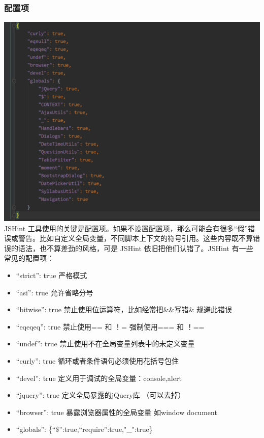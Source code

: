 \documentclass[hyperref, a4paper]{ctexart}
\providecommand{\tightlist}{%
  \setlength{\itemsep}{0pt}\setlength{\parskip}{0pt}}
\begin{document}
\hypertarget{ux914dux7f6eux9879}{%
\subsubsection{配置项}\label{ux914dux7f6eux9879}}

\includegraphics{screenshots/jshintrc.png} JSHint
工具使用的关键是配置项。如果不设置配置项，那么可能会有很多``假''错误或警告。比如自定义全局变量，不同脚本上下文的符号引用。这些内容既不算错误的语法，也不算差劲的风格，可是
JSHint 依旧把他们认错了。JSHint 有一些常见的配置项：

\begin{itemize}
\tightlist
\item
  ``strict'': true 严格模式
\item
  ``asi'': true 允许省略分号
\item
  ``bitwise'': true 禁止使用位运算符，比如经常把\&\&写错\& 规避此错误
\item
  ``eqeqeq'': true 禁止使用== 和 ！= 强制使用=== 和 ！==
\item
  ``undef'': true 禁止使用不在全局变量列表中的未定义变量
\item
  ``curly'': true 循环或者条件语句必须使用花括号包住
\item
  ``devel'': true 定义用于调试的全局变量：console,alert
\item
  ``jquery'': true 定义全局暴露的jQuery库 （可以去掉）
\item
  ``browser'': true 暴露浏览器属性的全局变量 如window document
\item
  ``globals'': \{``\$'':true,``require'':true,"\_":true\}
\end{itemize}
\end{document}
